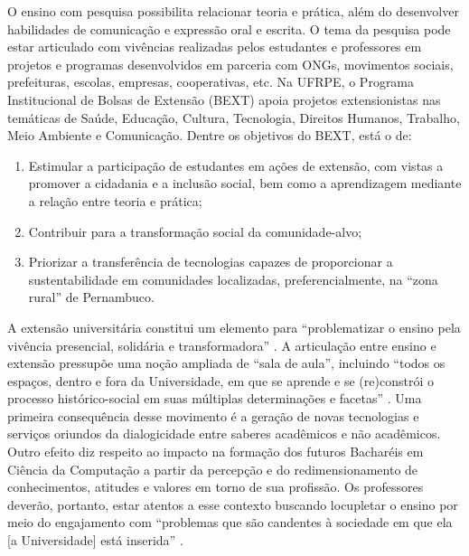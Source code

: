 \documentclass[
	12pt,				%
	openright,			%
  oneside,     %
	a4paper,			%
	chapter=TITLE,		%
	english,			%
	french,				%
	spanish,			%
	brazil				%
	]{abntex2}
\begin{document}
O ensino com pesquisa possibilita relacionar teoria e prática, além do desenvolver habilidades de comunicação e expressão oral e escrita. O tema da pesquisa pode estar articulado com vivências realizadas pelos estudantes e professores em projetos e programas desenvolvidos em parceria com ONGs, movimentos sociais, prefeituras, escolas, empresas, cooperativas, etc. Na UFRPE, o Programa Institucional de Bolsas de Extensão (BEXT) apoia projetos extensionistas nas temáticas de Saúde, Educação, Cultura, Tecnologia, Direitos Humanos, Trabalho, Meio Ambiente e Comunicação. Dentre os objetivos do BEXT, está o de:

\begin{enumerate}[label=(\alph*)]
    \item Estimular a participação de estudantes em ações de extensão, com vistas a promover a cidadania e a inclusão social, bem como a aprendizagem mediante a relação entre teoria e prática;
    \item Contribuir para a transformação social da comunidade-alvo;
    \item Priorizar a transferência de tecnologias capazes de proporcionar a sustentabilidade em comunidades localizadas, preferencialmente, na “zona rural” de Pernambuco. 	
\end{enumerate}

A extensão universitária constitui um elemento para “problematizar o ensino pela vivência presencial, solidária e transformadora” \cite{carpes2010ensino}. A articulação entre ensino e extensão pressupõe uma noção ampliada de “sala de aula”, incluindo “todos os espaços, dentro e fora da Universidade, em que se aprende e se (re)constrói o processo histórico-social em suas múltiplas determinações e facetas” \cite{forproex2012forum}. Uma primeira consequência desse movimento é a geração de novas tecnologias e serviços oriundos da dialogicidade entre saberes acadêmicos e não acadêmicos. Outro efeito diz respeito ao impacto na formação dos futuros Bacharéis em Ciência da Computação a partir da percepção e do redimensionamento de conhecimentos, atitudes e valores em torno de sua profissão. Os professores deverão, portanto, estar atentos a esse contexto buscando locupletar o ensino por meio do engajamento com “problemas que são candentes à sociedade em que ela [a Universidade] está inserida” \cite{barbieri2010escola}.  


%
%
\end{document}
